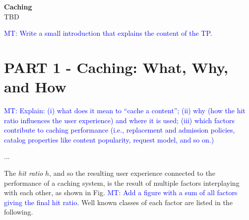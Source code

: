 \documentclass[10pt]{article}
\newcommand{\MT}[1]{\textcolor{blue}{MT: #1}}
\begin{document}
{\centering 
	{\Large {\bf Caching}}\\
	{\large TBD}\\[10pt]
}

\MT{Write a small introduction that explains the content of the TP.}

\section*{PART 1 - Caching: What, Why, and How}

\MT{Explain: (i) what does it mean to ``cache a content''; (ii) why (how the hit ratio influences the user experience) and where it is used; (iii) which factors contribute to caching performance (i.e., replacement and admission policies, catalog properties like content popularity, request model, and so on.)}

...

The \emph{hit ratio} $h$, and so the resulting user experience connected to the performance of a caching system, is the result of multiple factors interplaying with each other, as shown in Fig. \MT{Add a figure with a sum of all factors giving the final hit ratio}. Well known classes of each factor are listed in the following.
\end{document}
